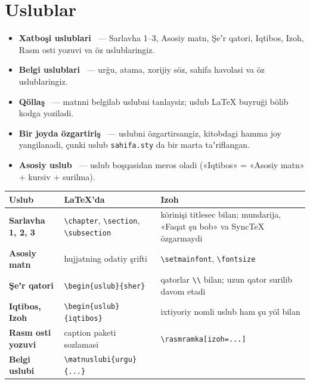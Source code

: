 
\section{Uslublar}\label{sec:sd-uslub}
\begin{itemize}
\item \textbf{Xatboşi uslublari} \beta\ --- Sarlavha 1--3, Asosiy matn, Şeʼr qatori, Iqtibos, Izoh, Rasm osti yozuvi va öz uslublaringiz.
\item \textbf{Belgi uslublari} \beta\ --- urğu, atama, xorijiy söz, sahifa havolasi va öz uslublaringiz.
\item \textbf{Qöllaş} \beta\ --- matnni belgilab uslubni tanlaysiz; uslub LaTeX buyruği bölib kodga yoziladi.
\item \textbf{Bir joyda özgartiriş} \beta\ --- uslubni özgartirsangiz, kitobdagi hamma joy yangilanadi, çunki uslub \texttt{sahifa.sty} da bir marta taʼriflangan.
\item \textbf{Asosiy uslub} \beta\ --- uslub boşqasidan meros oladi («Iqtibos» = «Asosiy matn» + kursiv + surilma).
\end{itemize}

\begin{center}\footnotesize
\begin{tabularx}{\linewidth}{>{\bfseries}p{30mm}>{\raggedright\arraybackslash}p{58mm}X}
\toprule
Uslub & LaTeX'da & Izoh\\
\midrule
Sarlavha 1, 2, 3 & \texttt{\textbackslash chapter}, \texttt{\textbackslash section}, \texttt{\textbackslash subsection} & körinişi titlesec bilan; mundarija, «Faqat şu bob» va SyncTeX özgarmaydi\\
Asosiy matn & hujjatning odatiy şrifti & \texttt{\textbackslash setmainfont}, \texttt{\textbackslash fontsize}\\
Şeʼr qatori & \texttt{\textbackslash begin\{uslub\}\{sher\}} & qatorlar \texttt{\textbackslash\textbackslash} bilan; uzun qator surilib davom etadi\\
Iqtibos, Izoh & \texttt{\textbackslash begin\{uslub\}\{iqtibos\}} & ixtiyoriy nomli uslub ham şu yöl bilan\\
Rasm osti yozuvi & caption paketi sozlamasi & \texttt{\textbackslash rasmramka[izoh=...]}\\
Belgi uslubi & \texttt{\textbackslash matnuslubi\{urgu\}\{...\}} & \\
\bottomrule
\end{tabularx}
\end{center}

